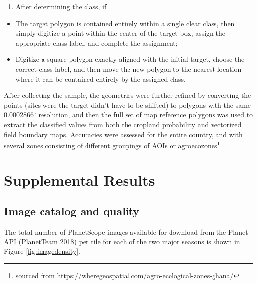 \documentclass[
  11pt,
  a4paper]{article}
\providecommand{\tightlist}{%
  \setlength{\itemsep}{0pt}\setlength{\parskip}{0pt}}
\begin{document}
\begin{enumerate}
\def\labelenumi{\arabic{enumi}.}
\setcounter{enumi}{1}
\tightlist
\item
  After determining the class, if
\end{enumerate}

\begin{itemize}
\tightlist
\item
  The target polygon is contained entirely within a single clear class,
  then simply digitize a point within the center of the target box,
  assign the appropriate class label, and complete the assignment;
\item
  Digitize a square polygon exactly aligned with the initial target,
  choose the correct class label, and then move the new polygon to the
  nearest location where it can be contained entirely by the assigned
  class.
\end{itemize}

After collecting the sample, the geometries were further refined by
converting the points (sites were the target didn't have to be shifted)
to polygons with the same 0.0002866\(^\circ\) resolution, and then the
full set of map reference polygons was used to extract the classified
values from both the cropland probability and vectorized field boundary
maps. Accuracies were assessed for the entire country, and with several
zones consisting of different groupings of AOIs or
agroecozones\footnote{sourced from https://wheregeospatial.com/agro-ecological-zones-ghana/}

\hypertarget{supplemental-results}{%
\section{Supplemental Results}\label{supplemental-results}}

\hypertarget{image-catalog-and-quality}{%
\subsection{Image catalog and quality}\label{image-catalog-and-quality}}

The total number of PlanetScope images available for download from the
Planet API (PlanetTeam 2018) per tile for each of the two major seasons
is shown in Figure \ref{fig:imagedensity}.
\end{document}
